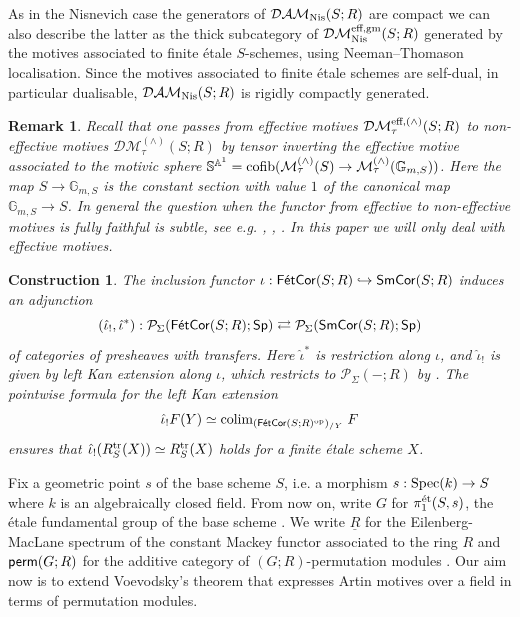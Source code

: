 \documentclass[reqno]{amsart}
\numberwithin{equation}{section}\theoremstyle{thms}
\theoremstyle{defn}
\newtheorem{cons}[equation]{Construction}
\newtheorem{rem}[equation]{Remark}
\newcommand{\bA}{\mathbb{A}}
\newcommand{\bG}{\mathbb{G}}
\newcommand{\bS}{\mathbb{S}}
\newcommand{\cM}{\mathcal{M}}
\newcommand{\cP}{\mathcal{P}}
\newcommand{\tn}[1]{\textnormal{#1}}
\newcommand{\tsf}[1]{\textsf{\textup{#1}}}
\newcommand{\mcal}[1]{\mathcal{#1}}
\newcommand{\underl}[1]{\underline{#1}}
\newcommand{\op}{\tn{op}}
\newcommand{\psigma}{\cP_{\Sigma}}
\newcommand{\Spec}{\tn{Spec}}
\newcommand{\spec}{\tsf{Sp}}
\newcommand{\permgr}{\tsf{perm}(G;R)}
\newcommand{\corsms}[1]{\tsf{SmCor}(S;#1)}
\newcommand{\corfets}[1]{\tsf{FétCor}(S;#1)}
\begin{document}
As in the Nisnevich case the generators of $\mcal{DAM}_{\tn{Nis}}(S;R)$ are compact we can also describe the latter as the thick subcategory of $\mcal{DM}^{\tn{eff,gm}}_{\tn{Nis}}(S;R)$ generated by the motives associated to finite étale $S$-schemes, using Neeman--Thomason localisation. Since the motives associated to finite étale schemes are self-dual, in particular dualisable, $\mcal{DAM}_{\tn{Nis}}(S;R)$ is rigidly compactly generated.

\begin{rem}
Recall that one passes from effective motives $\mcal{DM}^{\tn{eff},(\wedge)}_{\tau}(S;R)$ to non-effective motives $\mcal{DM}^{(\wedge)}_{\tau}(S;R)$ by tensor inverting the effective motive associated to the motivic sphere $\bS^{\bA^1} = \tn{cofib}(\cM_{\tau}^{(\wedge)}(S) \to \cM_{\tau}^{(\wedge)}(\bG_{m,S}))$. Here the map $S \to \bG_{m,S}$ is the constant section with value $1$ of the canonical map $\bG_{m,S} \to S$. In general the question when the functor from effective to non-effective motives is fully faithful is subtle, see  e.g. \cite[Theorem 4.3.1]{voe00}, \cite{voe10}, \cite[Corollary 11.2.15]{cd19}. In this paper we will only deal with effective motives.
\end{rem}

\begin{cons}\label{cons:fettosm}
The inclusion functor $\iota: \corfets{R} \hookrightarrow \corsms{R}$ induces an adjunction 
$$(\hat{\iota}_!,\hat{\iota}^*): \psigma(\corfets{R};\spec) \rightleftarrows \psigma(\corsms{R};\spec)$$ 
of categories of presheaves with transfers. Here $\hat{\iota}^*$ is restriction along $\iota$, and $\hat{\iota}_!$ is given by left Kan extension along $\iota$, which restricts to $\psigma(-;R)$ by \cite[Proposition 3.3.2]{chll24}. The pointwise formula for the left Kan extension
$$\hat{\iota}_!F(Y) \simeq \tn{colim}_{(\corfets{R}^\op)_{/Y}} \; F$$
ensures that $\hat{\iota}_!(R^{\tn{tr}}_S(X)) \simeq R^{\tn{tr}}_S(X)$ holds for a finite étale scheme $X$. 
\end{cons}

Fix a geometric point $s$ of the base scheme $S$, i.e. a morphism $s: \Spec(k) \to S$ where $k$ is an algebraically closed field. From now on, write $G$ for $\pi^{\tn{ét}}_1(S,s)$, the étale fundamental group of the base scheme \cite{sga1}. We write $\underl{R}$ for the Eilenberg-MacLane spectrum of the constant Mackey functor associated to the ring $R$ and $\permgr$ for the additive category of $(G;R)$-permutation modules \cite[§2]{bg23}. Our aim now is to extend Voevodsky's theorem \cite[§3.4]{voe00} that expresses Artin motives over a field in terms of permutation modules. 
\end{document}
